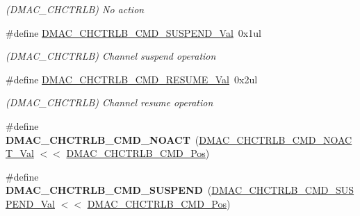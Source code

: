 \begin{DoxyCompactItemize}
\begin{DoxyCompactList}\small\item\em (D\+M\+A\+C\+\_\+\+C\+H\+C\+T\+R\+L\+B) No action \end{DoxyCompactList}\item 
\hypertarget{group___s_a_m_l21___d_m_a_c_ga069593b96a8e72c906bffbce9b077b4a}{}\#define \hyperlink{group___s_a_m_l21___d_m_a_c_ga069593b96a8e72c906bffbce9b077b4a}{D\+M\+A\+C\+\_\+\+C\+H\+C\+T\+R\+L\+B\+\_\+\+C\+M\+D\+\_\+\+S\+U\+S\+P\+E\+N\+D\+\_\+\+Val}~0x1ul\label{group___s_a_m_l21___d_m_a_c_ga069593b96a8e72c906bffbce9b077b4a}

\begin{DoxyCompactList}\small\item\em (D\+M\+A\+C\+\_\+\+C\+H\+C\+T\+R\+L\+B) Channel suspend operation \end{DoxyCompactList}\item 
\hypertarget{group___s_a_m_l21___d_m_a_c_gae6fef8dd26d28de1cb7d870aa5d2b253}{}\#define \hyperlink{group___s_a_m_l21___d_m_a_c_gae6fef8dd26d28de1cb7d870aa5d2b253}{D\+M\+A\+C\+\_\+\+C\+H\+C\+T\+R\+L\+B\+\_\+\+C\+M\+D\+\_\+\+R\+E\+S\+U\+M\+E\+\_\+\+Val}~0x2ul\label{group___s_a_m_l21___d_m_a_c_gae6fef8dd26d28de1cb7d870aa5d2b253}

\begin{DoxyCompactList}\small\item\em (D\+M\+A\+C\+\_\+\+C\+H\+C\+T\+R\+L\+B) Channel resume operation \end{DoxyCompactList}\item 
\hypertarget{group___s_a_m_l21___d_m_a_c_ga9d35fa6dc47f972dac50d094073480d6}{}\#define {\bfseries D\+M\+A\+C\+\_\+\+C\+H\+C\+T\+R\+L\+B\+\_\+\+C\+M\+D\+\_\+\+N\+O\+A\+C\+T}~(\hyperlink{group___s_a_m_l21___d_m_a_c_ga7b3affd4205334c28e3965856ba441e7}{D\+M\+A\+C\+\_\+\+C\+H\+C\+T\+R\+L\+B\+\_\+\+C\+M\+D\+\_\+\+N\+O\+A\+C\+T\+\_\+\+Val}    $<$$<$ \hyperlink{group___s_a_m_l21___d_m_a_c_ga7a6624b9ffc32912d6db81c95a81be97}{D\+M\+A\+C\+\_\+\+C\+H\+C\+T\+R\+L\+B\+\_\+\+C\+M\+D\+\_\+\+Pos})\label{group___s_a_m_l21___d_m_a_c_ga9d35fa6dc47f972dac50d094073480d6}

\item 
\hypertarget{group___s_a_m_l21___d_m_a_c_gacec5a9f2c442dfc3d3e1f1fd53b6182c}{}\#define {\bfseries D\+M\+A\+C\+\_\+\+C\+H\+C\+T\+R\+L\+B\+\_\+\+C\+M\+D\+\_\+\+S\+U\+S\+P\+E\+N\+D}~(\hyperlink{group___s_a_m_l21___d_m_a_c_ga069593b96a8e72c906bffbce9b077b4a}{D\+M\+A\+C\+\_\+\+C\+H\+C\+T\+R\+L\+B\+\_\+\+C\+M\+D\+\_\+\+S\+U\+S\+P\+E\+N\+D\+\_\+\+Val}  $<$$<$ \hyperlink{group___s_a_m_l21___d_m_a_c_ga7a6624b9ffc32912d6db81c95a81be97}{D\+M\+A\+C\+\_\+\+C\+H\+C\+T\+R\+L\+B\+\_\+\+C\+M\+D\+\_\+\+Pos})\label{group___s_a_m_l21___d_m_a_c_gacec5a9f2c442dfc3d3e1f1fd53b6182c}


\end{DoxyCompactItemize}
